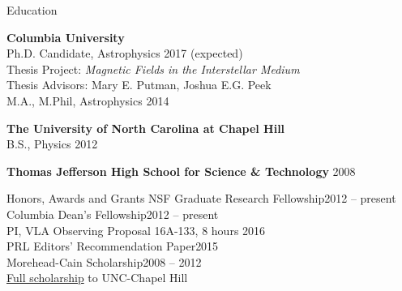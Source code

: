\documentclass{resume_clark} %
\begin{document}

\begin{rSection}{Education}

{\bf Columbia University}  \\ 
Ph.D. Candidate, Astrophysics  \hfill {2017 (expected)}  \\
\hspace*{0.5cm}Thesis Project: {\em Magnetic Fields in the Interstellar Medium}\\
\hspace*{0.5cm}Thesis Advisors: Mary E. Putman, Joshua E.G. Peek\\
M.A., M.Phil, Astrophysics \hfill {2014}  \\

\vspace{-0.3cm}

{\bf The University of North Carolina at Chapel Hill}\\ 
B.S., Physics \hfill {2012}\\

\vspace{-0.3cm}

{\bf Thomas Jefferson High School for Science \& Technology} \hfill {2008}\\

\end{rSection}


\begin{rSection}{Honors, Awards and Grants}
NSF Graduate Research Fellowship\hfill {2012 -- present}\\
Columbia Dean's Fellowship\hfill {2012 -- present}\\
PI, VLA Observing Proposal 16A-133, 8 hours \hfill{2016}\\
PRL Editors' Recommendation Paper\hfill {2015}\\
Morehead-Cain Scholarship\hfill {2008 -- 2012}\\
\hspace*{0.5cm}\href{http://www.moreheadcain.org}{Full scholarship} to UNC-Chapel Hill\\

\end{rSection}
\end{document}
